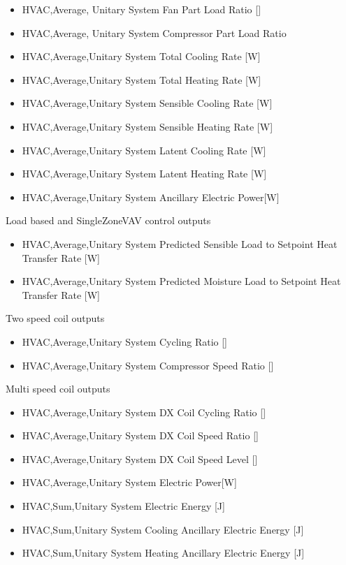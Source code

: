 \begin{itemize}
\item
  HVAC,Average, Unitary System Fan Part Load Ratio {[]}
\item
  HVAC,Average, Unitary System Compressor Part Load Ratio
\item
  HVAC,Average,Unitary System Total Cooling Rate {[}W{]}
\item
  HVAC,Average,Unitary System Total Heating Rate {[}W{]}
\item
  HVAC,Average,Unitary System Sensible Cooling Rate {[}W{]}
\item
  HVAC,Average,Unitary System Sensible Heating Rate {[}W{]}
\item
  HVAC,Average,Unitary System Latent Cooling Rate {[}W{]}
\item
  HVAC,Average,Unitary System Latent Heating Rate {[}W{]}
\item
  HVAC,Average,Unitary System Ancillary Electric Power{[}W{]}
\end{itemize}

Load based and SingleZoneVAV control outputs
\begin{itemize}
\tightlist
\item
HVAC,Average,Unitary System Predicted Sensible Load to Setpoint Heat Transfer Rate [W]
\item
HVAC,Average,Unitary System Predicted Moisture Load to Setpoint Heat Transfer Rate [W]
\end{itemize}

Two speed coil outputs

\begin{itemize}
\tightlist
\item
  HVAC,Average,Unitary System Cycling Ratio {[]}
\item
  HVAC,Average,Unitary System Compressor Speed Ratio {[]}
\end{itemize}

Multi speed coil outputs

\begin{itemize}
\item
  HVAC,Average,Unitary System DX Coil Cycling Ratio {[]}
\item
  HVAC,Average,Unitary System DX Coil Speed Ratio {[]}
\item
  HVAC,Average,Unitary System DX Coil Speed Level {[]}
\item
  HVAC,Average,Unitary System Electric Power{[}W{]}
\item
  HVAC,Sum,Unitary System Electric Energy {[}J{]}
\item
  HVAC,Sum,Unitary System Cooling Ancillary Electric Energy {[}J{]}
\item
  HVAC,Sum,Unitary System Heating Ancillary Electric Energy {[}J{]}
\end{itemize}

